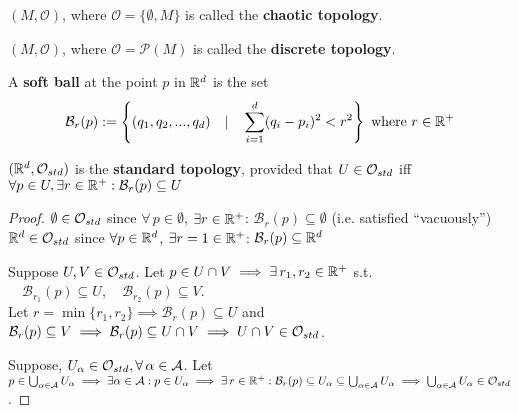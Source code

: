 \begin{definition}
  $(M , \mathcal{O})$, where $\mathcal{O} = \lbrace \emptyset, M\rbrace$ is called the \textbf{chaotic topology}.
\end{definition}

\begin{definition}
  $(M , \mathcal{O})$, where $\mathcal{O} = \mathcal{P}(M)$ is called the \textbf{discrete topology}.
\end{definition}

\begin{definition}
A \textbf{soft ball} at the point $p$ in $\mathbb{R}^d$ is the set
\begin{equation}
\displaystyle\mathcal{B}_r(p) := \left\{ (q_1, q_2, ..., q_d) \quad | \quad \sum_{i=1}^{d} (q_i - p_i)^2 < r^2 \right\} \text{ where } r \in \mathbb{R}^+
\end{equation}
\end{definition}

\begin{definition}
  $(\mathbb{R}^d, \mathcal{O}_{std})$ is the \textbf{standard topology}, provided that $U \in \mathcal{O}_{std}$ iff \\
  $\forall p \in U, \exists r \in \mathbb{R}^+: \mathcal{B}_r(p) \subseteq U$
\end{definition}

\begin{proof}
$\emptyset \in \mathcal{O}_{std}$ since $\forall \, p \in \emptyset$, $\exists r \in \mathbb{R}^+$: $\mathcal{B}_r(p) \subseteq \emptyset$ (i.e. satisfied ``vacuously'') \\
$\mathbb{R}^d \in \mathcal{O}_{std}$ since $\forall p \in \mathbb{R}^d$, $\exists r = 1 \in \mathbb{R}^+$: $\mathcal{B}_r(p) \subseteq \mathbb{R}^d$
 
Suppose $U, V \in \mathcal{O}_{std}$. Let $p \in U \cap V \implies \exists \, r_1, r_2 \in \mathbb{R}^+$ s.t. $\quad \mathcal{B}_{r_1}(p) \subseteq U, \quad \mathcal{B}_{r_2}(p) \subseteq V$. \\
Let $r=\min{ \lbrace r_1, r_2 \rbrace} \implies \mathcal{B}_r(p) \subseteq U$ and $\mathcal{B}_r(p) \subseteq V \implies \mathcal{B}_r(p) \subseteq U \cap V \implies U \cap V \in \mathcal{O}_{std}$.

Suppose, $U_{\alpha} \in \mathcal{O}_{std}, \forall \, \alpha \in \mathcal{A}$. Let $p \in \bigcup_{\alpha \in \mathcal{A}} U_{\alpha} \implies \exists \alpha \in \mathcal{A}: p \in U_{\alpha} \\
\implies \exists \, r \in \mathbb{R}^+ : \mathcal{B}_{r}(p) \subseteq U_{\alpha} \subseteq \bigcup_{\alpha \in \mathcal{A}} U_{\alpha} \implies \bigcup_{\alpha \in \mathcal{A}} U_{\alpha} \in \mathcal{O}_{std}$.
\end{proof}

